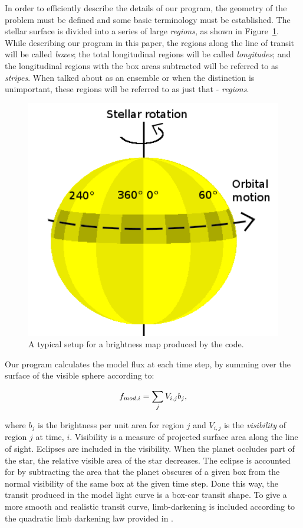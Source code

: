 In order to efficiently describe the details of our program, the geometry of the problem must be defined and some basic terminology must be established. The stellar surface is divided into a series of large {\it regions}, as shown in Figure~\ref{CoRoT}. While describing our program in this paper, the regions along the line of transit will be called {\it boxes}; the total longitudinal regions will be called {\it longitudes}; and the longitudinal regions with the box areas subtracted will be referred to as {\it stripes}. When talked about as an ensemble or when the distinction is unimportant, these regions will be referred to as just that - {\it regions}.

\begin{figure}[h]
	\centering
	\includegraphics[width=.5\textwidth]{images/modelGeometry.png}
	\caption{A typical setup for a brightness map produced by the code. \cite{Huber2009}}
	\label{CoRoT}
\end{figure}

Our program calculates the model flux at each time step, by summing over the surface of the visible sphere according to:

\begin{equation}
	\mbox{$f_{mod,i}$} = \sum_j V_{i,j}b_j, 
\end{equation}

where $b_j$ is the brightness per unit area for region $j$ and $V_{i,j}$ is the {\it visibility} of region $j$ at time, $i$. Visibility is a measure of projected surface area along the line of sight. Eclipses are included in the visibility. When the planet occludes part of the star, the relative visible area of the star decreases. The eclipse is accounted for by subtracting the area that the planet obscures of a given box from the normal visibility of the same box at the given time step. Done this way, the transit produced in the model light curve is a box-car transit shape. To give a more smooth and realistic transit curve, limb-darkening is included according to the quadratic limb darkening law provided in \cite{Claret2004}.

